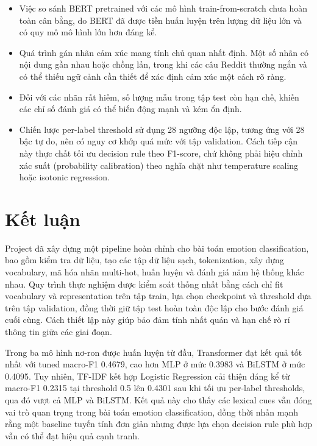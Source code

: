 \documentclass[12pt,a4paper]{article}
\begin{document}
\begin{itemize}

\item Việc so sánh BERT pretrained với các mô hình train-from-scratch chưa hoàn toàn cân bằng, do BERT đã được tiền huấn luyện trên lượng dữ liệu lớn và có quy mô mô hình lớn hơn đáng kể.

\item Quá trình gán nhãn cảm xúc mang tính chủ quan nhất định. Một số nhãn có nội dung gần nhau hoặc chồng lấn, trong khi các câu Reddit thường ngắn và có thể thiếu ngữ cảnh cần thiết để xác định cảm xúc một cách rõ ràng.

\item Đối với các nhãn rất hiếm, số lượng mẫu trong tập test còn hạn chế, khiến các chỉ số đánh giá có thể biến động mạnh và kém ổn định.

\item Chiến lược per-label threshold sử dụng 28 ngưỡng độc lập, tương ứng với 28 bậc tự do, nên có nguy cơ khớp quá mức với tập validation. Cách tiếp cận này thực chất tối ưu decision rule theo F1-score, chứ không phải hiệu chỉnh xác suất (probability calibration) theo nghĩa chặt như temperature scaling hoặc isotonic regression.

\end{itemize}


\section{Kết luận}

Project đã xây dựng một pipeline hoàn chỉnh cho bài toán emotion classification, bao gồm kiểm tra dữ liệu, tạo các tập dữ liệu sạch, tokenization, xây dựng vocabulary, mã hóa nhãn multi-hot, huấn luyện và đánh giá năm hệ thống khác nhau. Quy trình thực nghiệm được kiểm soát thống nhất bằng cách chỉ fit vocabulary và representation trên tập train, lựa chọn checkpoint và threshold dựa trên tập validation, đồng thời giữ tập test hoàn toàn độc lập cho bước đánh giá cuối cùng. Cách thiết lập này giúp bảo đảm tính nhất quán và hạn chế rò rỉ thông tin giữa các giai đoạn.

Trong ba mô hình nơ-ron được huấn luyện từ đầu, Transformer đạt kết quả tốt nhất với tuned macro-F1 0.4679, cao hơn MLP ở mức 0.3983 và BiLSTM ở mức 0.4095. Tuy nhiên, TF-IDF kết hợp Logistic Regression cải thiện đáng kể từ macro-F1 0.2315 tại threshold 0.5 lên 0.4301 sau khi tối ưu per-label thresholds, qua đó vượt cả MLP và BiLSTM. Kết quả này cho thấy các lexical cues vẫn đóng vai trò quan trọng trong bài toán emotion classification, đồng thời nhấn mạnh rằng một baseline tuyến tính đơn giản nhưng được lựa chọn decision rule phù hợp vẫn có thể đạt hiệu quả cạnh tranh.
\end{document}
